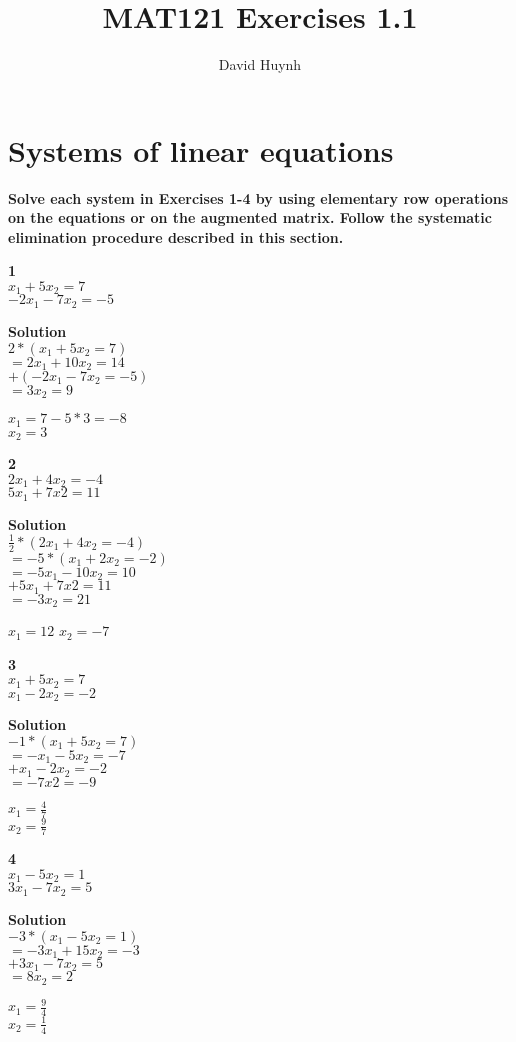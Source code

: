 \documentclass{article}
\begin{document}
\title{MAT121 Exercises 1.1}
\author{David Huynh}
\date{}

\maketitle

\section{Systems of linear equations}

\bf{Solve each system in Exercises 1-4 by using elementary row operations on the equations or on the augmented matrix. Follow the systematic elimination procedure described in this section.}

\bf{1}\\
$x_{1} + 5x_{2} = 7$\\
$-2x_{1} - 7x_{2} = -5$

\bf{Solution}\\
$2*(x_{1} + 5x_{2} = 7)$\\
$= 2x_{1} + 10x_{2} = 14$\\
$+(-2x_{1} - 7x_{2} = -5)$\\
$= 3x_{2} = 9$

$x_{1} = 7 - 5 * 3 = -8$\\
$x_{2}  = 3$

\bf{2}\\
$2x_{1} + 4x_{2} = -4$\\
$5x_{1} + 7x{2} = 11$

\bf{Solution}\\
$\frac{1}{2}*(2x_{1} + 4x_{2} = -4)$\\
$=-5*(x_{1} + 2x_{2} = -2)$\\
$=-5x_{1} - 10x_{2} = 10$\\
$+5x_{1} + 7x{2} = 11$\\
$= -3x_{2} = 21$

$x_{1} = 12$
$x_{2} = -7$

\bf{3}\\
$x_{1} + 5x_{2} = 7$\\
$x_{1} - 2x_{2} = -2$

\bf{Solution}\\
$-1*(x_{1} + 5x_{2} = 7)$\\
$=-x_{1} - 5x_{2} = -7$\\
$+x_{1} -2x_{2} = -2$\\
$= -7x{2} = -9$

$x_{1} = \frac{4}{7}$\\
$x_{2} = \frac{9}{7}$

\bf{4}\\
$x_{1} - 5x_{2} = 1$\\
$3x_{1} - 7x_{2} = 5$

\bf{Solution}\\
$-3*(x_{1} - 5x_{2} = 1)$\\
$=-3x_{1}+15x_{2} = -3$\\
$+ 3x_{1} - 7x_{2} = 5$\\
$= 8x_{2} = 2$

$x_{1} = \frac{9}{4}$\\
$x_{2} = \frac{1}{4}$
\end{document}
